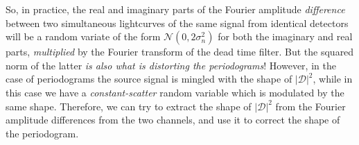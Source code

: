 \documentclass[twocolumn]{aastex61}
\newcommand{\Normal}{\ensuremath{{\mathcal N}}\xspace}
\begin{document}
So, in practice, the real and imaginary parts of the Fourier amplitude \textit{difference} between two simultaneous lightcurves of the same signal from identical detectors will be a random variate of the form $\Normal(0, 2\sigma_{n}^2)$ for both the imaginary and real parts, \textit{multiplied} by the Fourier transform of the dead time filter.
But the squared norm of the latter \textit{is also what is distorting the periodograms}!
However, in the case of periodograms the source signal is mingled with the shape of $|\mathcal{D}|^2$, while in this case we have a \textit{constant-scatter} random variable which is modulated by the same shape. Therefore, we can try to extract the shape of $|\mathcal{D}|^2$ from the Fourier amplitude differences from the two channels, and use it to correct the shape of the periodogram.
\end{document}
